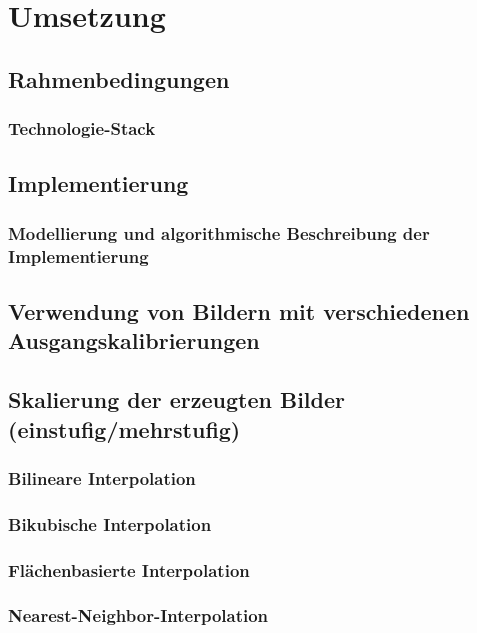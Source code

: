\documentclass[
fontsize=10pt, 
listof = totoc,
parskip = half	
]{report}
\begin{document}
\chapter{Umsetzung}
\label{ch:Umsetzung}

\section{Rahmenbedingungen}

\subsection{Technologie-Stack}
\label{subsec:TecStack}

\section{Implementierung}

\subsection{Modellierung und algorithmische Beschreibung der Implementierung}
\label{subsec:Modellierung}

\section{Verwendung von Bildern mit verschiedenen Ausgangskalibrierungen}

\section{Skalierung der erzeugten Bilder (einstufig/mehrstufig)}

\subsection{Bilineare Interpolation}

\subsection{Bikubische Interpolation}

\subsection{Flächenbasierte Interpolation}

\subsection{Nearest-Neighbor-Interpolation}
\end{document}
